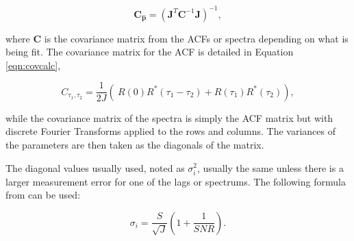 \begin{equation}
\label{eqn:jacinv}
\mathbf{C}_{\mathbf{\hat{p}}}=(\mathbf{J}^T \mathbf{C}^{-1}\mathbf{J})^{-1},
\end{equation}

\noindent where $ \mathbf{C}$ is the covariance matrix from the ACFs or spectra depending on what is being fit. The covariance matrix for the ACF is detailed in Equation \ref{eqn:covcalc}, 

\begin{equation}
\label{eqn:covcalc}
C_{\tau_1,\tau_2} = \frac{1}{2J} \left( \ R(0)  R^*(\tau_1-\tau_2) +  R(\tau_1) R^*(\tau_2) \right),
\end{equation}

\noindent while the covariance matrix of the spectra is simply the ACF matrix but with discrete Fourier Transforms applied to the rows and columns. The variances of the parameters are then taken as the diagonals of the matrix.


%
%



The diagonal values usually used, noted as $\sigma_i^2$, usually the same unless there is a larger measurement error for one of the lags or spectrums.  The following formula from  \cite{nicollsisrschool2013} can be used:

\begin{equation}
\label{sigpow}
\sigma_i = \frac{S}{\sqrt{J}}\left(1+\frac{1}{SNR}\right).
\end{equation}


